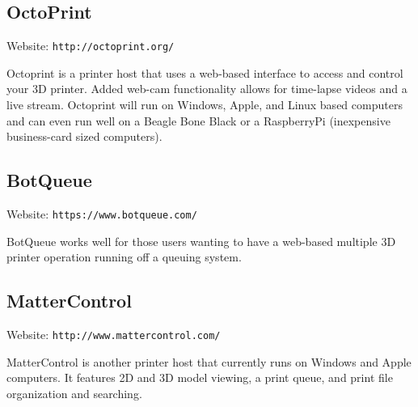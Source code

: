 \subsection{OctoPrint}
Website: \texttt{http://octoprint.org/}

Octoprint is a printer host that uses a web-based interface to access and control your 3D printer. Added web-cam functionality allows for time-lapse videos and a live stream. Octoprint will run on Windows, Apple, and Linux based computers and can even run well on a Beagle Bone Black or a RaspberryPi (inexpensive business-card sized computers).

\subsection{BotQueue}
Website: \texttt{https://www.botqueue.com/}

BotQueue works well for those users wanting to have a web-based multiple 3D printer operation running off a queuing system.


\subsection{MatterControl}
Website: \texttt{http://www.mattercontrol.com/}

MatterControl is another printer host that currently runs on Windows and Apple computers. It features 2D and 3D model viewing, a print queue, and print file organization and searching.
